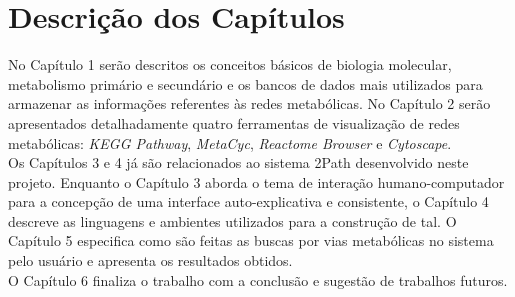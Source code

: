 \section{Descrição dos Capítulos}
\indent No Capítulo 1 serão descritos os conceitos básicos de biologia molecular, metabolismo primário e secundário e os bancos de dados mais utilizados para armazenar as informações referentes às redes metabólicas. No Capítulo 2 serão apresentados detalhadamente quatro ferramentas de visualização de redes metabólicas: \textit{KEGG Pathway}, \textit{MetaCyc}, \textit{Reactome Browser} e \textit{Cytoscape}. \\ 
\indent Os Capítulos 3 e 4 já são relacionados ao sistema 2Path desenvolvido neste projeto. Enquanto o Capítulo 3 aborda o tema de interação humano-computador para a concepção de uma interface auto-explicativa e consistente, o Capítulo 4 descreve as linguagens e ambientes utilizados para a construção de tal. O Capítulo 5 especifica como são feitas as buscas por vias metabólicas no sistema pelo usuário e apresenta os resultados obtidos. \\
\indent O Capítulo 6 finaliza o trabalho com a conclusão e sugestão de trabalhos futuros.
